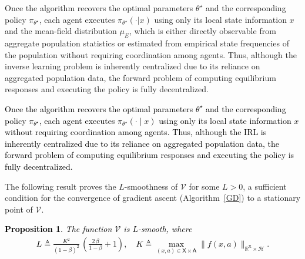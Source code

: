 \documentclass[11pt]{article}
\newcommand{\R}{\mathbb{R}}
\newcommand{\sX}{{\mathsf X}}
\newcommand{\sA}{{\mathsf A}}
\newcommand{\cH}{{\mathcal H}}
\newcommand{\V}{{\mathcal V}}
\newcommand{\tb}[1]{\textcolor{black}{#1}} %
\newtheorem{proposition}{Proposition}[section]
\begin{document}

Once the algorithm recovers the optimal parameters \(\theta^\star\) and the corresponding policy \(\pi_{\theta^\star}\), each agent executes \(\pi_{\theta^\star}(\cdot| x)\) using only its local state information $x$ and the mean-field distribution $\mu_E$, which is either directly observable from aggregate population statistics or estimated from empirical state frequencies of the population without requiring coordination among agents. Thus, although the inverse learning problem is inherently centralized due to its reliance on aggregated population data, the forward problem of computing equilibrium responses and executing the policy is fully decentralized.



\tb{Once the algorithm recovers the optimal parameters $\theta^\star$ 
and the corresponding policy $\pi_{\theta^\star}$, each agent executes 
$\pi_{\theta^\star}(\cdot \mid x)$ using only its local state information $x$ 
without requiring coordination among agents. Thus, although the IRL is inherently centralized due  to its reliance on aggregated population data, the forward problem of computing 
equilibrium responses and executing the policy is fully decentralized.}

The following result proves the $L$-smoothness of $\V$ for some $L>0$, a sufficient condition for the convergence of gradient ascent (Algorithm~\ref{GD}) to a stationary point of $\V$.

\tb{
\begin{proposition}\label{prop}
The function $\V$ is $L$-smooth, where 
\begin{align*}
L \triangleq \frac{K^2}{(1-\beta)^2} \, \left(\frac{2 \, \beta}{1-\beta} + 1 \right), \quad
K \triangleq \max_{(x,a) \in \sX \times \sA} \| f(x,a) \|_{\R^{\sX} \times \cH}.
\end{align*} 
\end{proposition}
}
\end{document}
